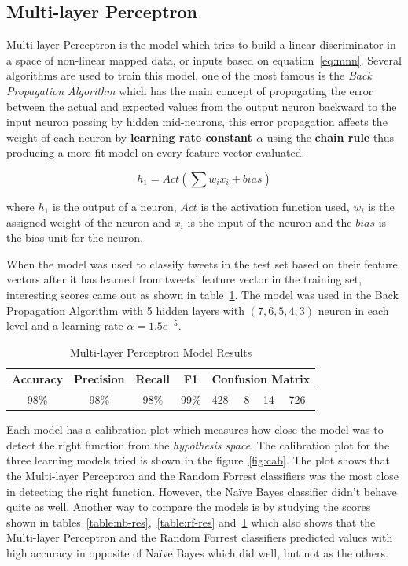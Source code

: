 \documentclass[conference]{IEEEtran}
\begin{document}
\subsection{Multi-layer Perceptron}
Multi-layer Perceptron is the model which tries to build a linear discriminator in a space of non-linear mapped data, or inputs based on equation~\ref{eq:mnn}. Several algorithms are used to train this model, one of the most famous is the \textit{Back Propagation Algorithm} which has the main concept of propagating the error between the actual and expected values from the output neuron backward to the input neuron passing by hidden mid-neurons, this error propagation affects the weight of each neuron by \textbf{learning rate constant $\alpha$} using the \textbf{chain rule} thus producing a more fit model on every feature vector evaluated.

\begin{equation}
    h_1 = Act(\sum w_i x_i + bias)
    \label{eq:mnn}
\end{equation}

where $h_1$ is the output of a neuron, $Act$ is the activation function used, $w_i$ is the assigned weight of the neuron and $x_i$ is the input of the neuron and the $bias$ is the bias unit for the neuron.

When the model was used to classify tweets in the test set based on their feature vectors after it has learned from tweets' feature vector in the training set, interesting scores came out as shown in table~\ref{table:mnn-res}. The model was used in the Back Propagation Algorithm with 5 hidden layers with $(7, 6, 5, 4, 3)$ neuron in each level and a learning rate $\alpha=1.5e^{-5}$.

\begin{table}
\centering
\caption{Multi-layer Perceptron Model Results}
\label{table:mnn-res}
\begin{tabular}{|c|c|c|c|l|l|l|l|} 
\hline
\rowcolor[rgb]{0.753,0.753,0.753} Accuracy & Precision & Recall & F1   & \multicolumn{4}{l|}{Confusion Matrix}  \\ 
\hline
\rowcolor[rgb]{0.753,0.753,0.753} 98\%     & 98\%      & 98\%   & 99\% & 428 & 8 & 14 & 726                     \\
\hline
\end{tabular}
\end{table}

Each model has a calibration plot which measures how close the model was to detect the right function from the \textit{hypothesis space}. The calibration plot for the three learning models tried is shown in the figure~\ref{fig:cab}. The plot shows that the Multi-layer Perceptron and the Random Forrest classifiers was the most close in detecting the right function. However, the Naïve Bayes classifier didn't behave quite as well. Another way to compare the models is by studying the scores shown in tables~\ref{table:nb-res},~\ref{table:rf-res} and~\ref{table:mnn-res} which also shows that the Multi-layer Perceptron and the Random Forrest classifiers predicted values with high accuracy in opposite of Naïve Bayes which did well, but not as the others.
\end{document}
